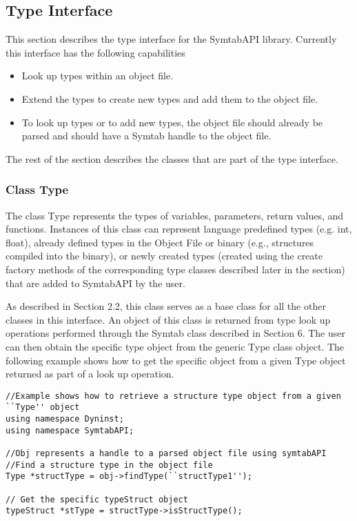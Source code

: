 \subsection{Type Interface}
This section describes the type interface for the SymtabAPI library. Currently this interface has the following capabilities
\begin{itemize}
    \item Look up types within an object file.
    \item Extend the types to create new types and add them to the object file.
    \item To look up types or to add new types, the object file should already be parsed and should have a Symtab handle to the object file. 
\end{itemize}
    
The rest of the section describes the classes that are part of the type interface.

\subsubsection{Class Type}

The class Type represents the types of variables, parameters, return values, and functions. Instances of this class can represent language predefined types (e.g. int, float), already defined types in the Object File or binary (e.g., structures compiled into the binary), or newly created types (created using the create factory methods of the corresponding type classes described later in the section) that are added to SymtabAPI by the user. 

As described in Section 2.2, this class serves as a base class for all the other classes in this interface. An object of this class is returned from type look up operations performed through the Symtab class described in Section 6. The user can then obtain the specific type object from the generic Type class object. The following example shows how to get the specific object from a given Type object returned as part of a look up operation.

\begin{lstlisting}
//Example shows how to retrieve a structure type object from a given ``Type'' object
using namespace Dyninst;
using namespace SymtabAPI;

//Obj represents a handle to a parsed object file using symtabAPI
//Find a structure type in the object file
Type *structType = obj->findType(``structType1'');

// Get the specific typeStruct object
typeStruct *stType = structType->isStructType();
\end{lstlisting}

